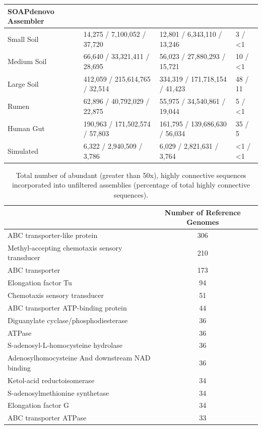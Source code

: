 \documentclass[10pt]{article}
\begin{document}
\begin{landscape}
\begin{table}[ht]
\begin{tabular}{*{4}{p{5cm}}}
\end{tabular}
\begin{tabular}{*{4}{p{5cm}}}
\hline
SOAPdenovo Assembler  \\ 
\hline
Small Soil		&14,275 / 7,100,052 / 37,720	&12,801 / 6,343,110 / 13,246		&3 / \textless1\\
Medium Soil	&66,640 / 33,321,411 / 28,695	&56,023 / 27,880,293 / 15,721		&10 / \textless1\\
Large Soil		&412,059 / 215,614,765 / 32,514	&334,319 /  171,718,154 / 41,423	&48 / 11\\
Rumen		&62,896 / 40,792,029 / 22,875		&55,975 / 34,540,861 / 19,044	&5 / \textless 1\\
Human Gut	&190,963 / 171,502,574 / 57,803	&161,795 / 139,686,630 / 56,034	&35 / 5\\
Simulated		&6,322 / 2,940,509 / 3,786		&6,029 / 2,821,631 / 3,764	&\textless1 / \textless1\\
\end{tabular}
\end{table}
\end{landscape}


\begin{table}
\caption{Total number of abundant (greater than 50x), highly connective sequences incorporated into unfiltered assemblies (percentage of total highly connective sequences).}
\begin{tabular}{lc c}
\hline
& Number of Reference Genomes\\
\hline
ABC transporter-like protein	&306\\
Methyl-accepting chemotaxis sensory transducer	&210\\
ABC transporter	&173\\
Elongation factor Tu	&94\\
Chemotaxis sensory transducer	&51\\
ABC transporter ATP-binding protein	&44\\
Diguanylate cyclase/phosphodiesterase	&36\\
ATPase	&36\\
S-adenosyl-L-homocysteine hydrolase	&36\\
Adenosylhomocysteine And downstream NAD binding	&36\\
Ketol-acid reductoisomerase	&34\\
S-adenosylmethionine synthetase	&34\\
Elongation factor G	&34\\
ABC transporter ATPase	&33\\
\end{tabular}
\end{table}
\end{document}
